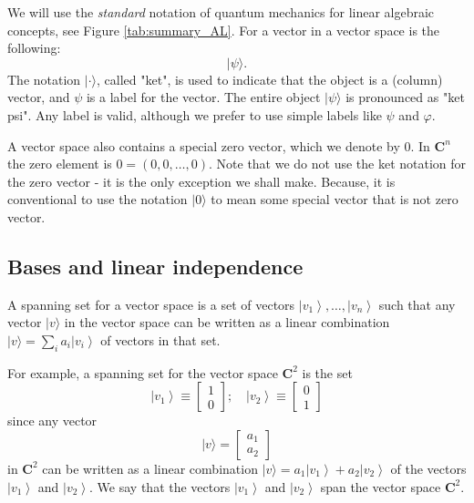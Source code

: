 \documentclass[
	11pt, %
	fleqn, %
	a4paper, %
]{LegrandOrangeBook}
\begin{document}
We will use the \textit{standard} notation of quantum mechanics for linear algebraic concepts, see Figure \ref{tab:summary_AL}. For a vector in a vector space is the following:
$$
|\psi\rangle .
$$
The notation $|\cdot\rangle$, called "ket", is used to indicate that the object is a (column) vector, and $\psi$ is a label for the vector. The entire object $|\psi\rangle$ is pronounced  as "ket psi". Any label is valid, although we prefer to use simple labels like $\psi$ and $\varphi$.

\begin{remark} %
    A vector space also contains a special zero vector, which we denote by 0. In $\mathbf{C}^{n}$ the zero element is $0=(0,0, \ldots, 0)$. Note that we do not use the ket notation for the zero vector - it is the only exception we shall make. Because, it is conventional to use the notation $|0\rangle$ to mean some special vector that is not zero vector.
\end{remark}

\subsection{Bases and linear independence} %

A spanning set for a vector space is a set of vectors $\left|v_{1}\right\rangle, \ldots,\left|v_{n}\right\rangle$ such that any vector $|v\rangle$ in the vector space can be written as a linear combination $|v\rangle=\sum_{i} a_{i}\left|v_{i}\right\rangle$ of vectors in that set. 

\begin{example}
    For example, a spanning set for the vector space $\mathbf{C}^{2}$ is the set
    $$
    \left|v_{1}\right\rangle \equiv\left[\begin{array}{l}
    1 \\
    0
    \end{array}\right] ; \quad\left|v_{2}\right\rangle  \equiv\left[\begin{array}{l}
    0 \\
    1
    \end{array}\right]
  $$
    since any vector
    $$
    |v\rangle=\left[\begin{array}{l}
    a_{1} \\
    a_{2}
    \end{array}\right]
    $$
    in $\mathbf{C}^{2}$ can be written as a linear combination $|v\rangle=a_{1}\left|v_{1}\right\rangle+a_{2}\left|v_{2}\right\rangle$ of the vectors $\left|v_{1}\right\rangle$ and $\left|v_{2}\right\rangle$. We say that the vectors $\left|v_{1}\right\rangle$ and $\left|v_{2}\right\rangle$ span the vector space $\mathbf{C}^{2}$.
\end{example}
\end{document}
